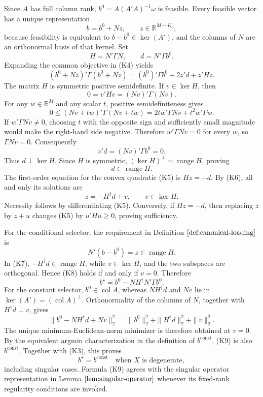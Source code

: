 Since \(A\) has full column rank, \(b^0=A(A'A)^{-1}\omega\) is feasible.  Every feasible vector has a unique representation
\[
b=b^0+Nz,
\qquad z\in\mathbb R^{M-K_0},
\tag{K4}
\]
because feasibility is equivalent to \(b-b^0\in\ker(A')\), and the columns of \(N\) are an orthonormal basis of that kernel.  Set
\[
H=N'\Gamma N,
\qquad d=N'\Gamma b^0.
\]
Expanding the common objective in (K4) yields
\[
(b^0+Nz)'\Gamma(b^0+Nz)
=(b^0)'\Gamma b^0+2z'd+z'Hz.
\tag{K5}
\]
The matrix \(H\) is symmetric positive semidefinite.  If \(v\in\ker H\), then
\[
0=v'Hv=(Nv)'\Gamma(Nv).
\]
For any \(w\in\mathbb R^M\) and any scalar \(t\), positive semidefiniteness gives
\[
0\le (Nv+tw)'\Gamma(Nv+tw)
=2t w'\Gamma Nv+t^2w'\Gamma w.
\]
If \(w'\Gamma Nv\ne0\), choosing \(t\) with the opposite sign and sufficiently small magnitude would make the right-hand side negative.  Therefore \(w'\Gamma Nv=0\) for every \(w\), so \(\Gamma Nv=0\).  Consequently
\[
v'd=(Nv)'\Gamma b^0=0.
\]
Thus \(d\perp\ker H\).  Since \(H\) is symmetric, \((\ker H)^\perp=\operatorname{range}H\), proving
\[
d\in\operatorname{range}H.
\tag{K6}
\]
The first-order equation for the convex quadratic (K5) is \(Hz=-d\).  By (K6), all and only its solutions are
\[
z=-H^\dagger d+v,
\qquad v\in\ker H.
\tag{K7}
\]
Necessity follows by differentiating (K5).  Conversely, if \(Hz=-d\), then replacing \(z\) by \(z+u\) changes (K5) by \(u'Hu\ge0\), proving sufficiency.

For the conditional selector, the requirement in Definition \(\ref{def:canonical-loading}\) is
\[
N'(b-b^0)=z\in\operatorname{range}H.
\tag{K8}
\]
In (K7), \(-H^\dagger d\in\operatorname{range}H\), while \(v\in\ker H\), and the two subspaces are orthogonal.  Hence (K8) holds if and only if \(v=0\).  Therefore
\[
b^\star=b^0-NH^\dagger N'\Gamma b^0.
\tag{K9}
\]
For the constant selector, \(b^0\in\operatorname{col}A\), whereas \(NH^\dagger d\) and \(Nv\) lie in \(\ker(A')=(\operatorname{col}A)^\perp\).  Orthonormality of the columns of \(N\), together with \(H^\dagger d\perp v\), gives
\[
\|b^0-NH^\dagger d+Nv\|_2^2
=\|b^0\|_2^2+\|H^\dagger d\|_2^2+\|v\|_2^2.
\tag{K10}
\]
The unique minimum-Euclidean-norm minimizer is therefore obtained at \(v=0\).  By the equivalent argmin characterization in the definition of \(b^{\mathrm{const}}\), (K9) is also \(b^{\mathrm{const}}\).  Together with (K3), this proves
\[
b^\star=b^{\mathrm{const}}
\quad\text{when \(X\) is degenerate},
\]
including singular cases.  Formula (K9) agrees with the singular operator representation in Lemma \(\ref{lem:singular-operator}\) whenever its fixed-rank regularity conditions are invoked.


